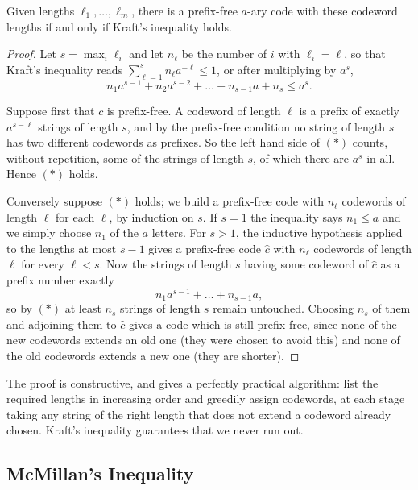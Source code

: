 \documentclass[a4paper]{scrartcl}
\begin{document}
\begin{theorem}[Kraft]
	Given lengths $\ell_1, \dots, \ell_m$, there is a prefix-free $a$-ary code with these codeword lengths if and only if Kraft's inequality holds.
\end{theorem}

\begin{proof}
	Let $s = \max_i \ell_i$ and let $n_\ell$ be the number of $i$ with $\ell_i = \ell$, so that Kraft's inequality reads $\sum_{\ell=1}^s n_\ell a^{-\ell} \le 1$, or after multiplying by $a^s$,
	\begin{equation*} n_1 a^{s-1} + n_2 a^{s-2} + \dots + n_{s-1}a + n_s \le a^s. \tag{$\ast$}\end{equation*}

	Suppose first that $c$ is prefix-free. A codeword of length $\ell$ is a prefix of exactly $a^{s-\ell}$ strings of length $s$, and by the prefix-free condition no string of length $s$ has two different codewords as prefixes. So the left hand side of $(\ast)$ counts, without repetition, some of the strings of length $s$, of which there are $a^s$ in all. Hence $(\ast)$ holds.

	Conversely suppose $(\ast)$ holds; we build a prefix-free code with $n_\ell$ codewords of length $\ell$ for each $\ell$, by induction on $s$. If $s = 1$ the inequality says $n_1 \le a$ and we simply choose $n_1$ of the $a$ letters. For $s > 1$, the inductive hypothesis applied to the lengths at most $s-1$ gives a prefix-free code $\hat c$ with $n_\ell$ codewords of length $\ell$ for every $\ell < s$. Now the strings of length $s$ having some codeword of $\hat c$ as a prefix number exactly
	$$n_1 a^{s-1} + \dots + n_{s-1}a,$$
	so by $(\ast)$ at least $n_s$ strings of length $s$ remain untouched. Choosing $n_s$ of them and adjoining them to $\hat c$ gives a code which is still prefix-free, since none of the new codewords extends an old one (they were chosen to avoid this) and none of the old codewords extends a new one (they are shorter).
\end{proof}

\begin{remark}
	The proof is constructive, and gives a perfectly practical algorithm: list the required lengths in increasing order and greedily assign codewords, at each stage taking any string of the right length that does not extend a codeword already chosen. Kraft's inequality guarantees that we never run out.
\end{remark}

\subsection{McMillan's Inequality}
\end{document}
